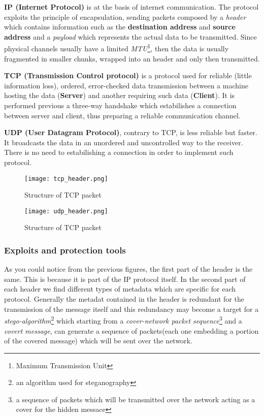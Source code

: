 \documentclass[../../main.tex]{subfiles}
\begin{document}
    \textbf{IP (Internet Protocol)} is at the basis of internet communication.
    The protocol exploits the principle of encapsulation, sending packets
    composed by a \emph{header} which contains information such as the
    \textbf{destination address} and \textbf{source address} and a
    \emph{payload} which represents the actual data to be transmitted.
    Since physical channels usually have a limited \emph{MTU}\footnote{Maximum
    Transmission Unit}, then the data is usually fragmented in smaller chunks,
    wrapped into an header and only then transmitted.
    
    \textbf{TCP (Transmission Control protocol)} is a protocol used for reliable
    (little information loss), ordered, error-checked data transmission between
    a machine hosting the data (\textbf{Server}) and another requiring such data
    (\textbf{Client}). It is performed previous a three-way handshake which
    estabilishes a connection between server and client, thus preparing a
    reliable communication channel.

    \textbf{UDP (User Datagram Protocol)}, contrary to TCP, is less reliable but
    faster.
    It broadcasts the data in an unordered and uncontrolled way to the receiver. 
    There is no need to estabilishing a connection in order to implement such
    protocol.

    \begin{figure}[h]
        \centering
        \caption{Structure of TCP packet}
        \texttt{[image: tcp\_header.png]}
    \end{figure}

    \begin{figure}[h]
        \centering
        \caption{Structure of TCP packet}
        \texttt{[image: udp\_header.png]}
    \end{figure}

    \pagebreak

    \subsubsection{Exploits and protection tools}

    As you could notice from the previous figures, the first part of the header
    is the same. This is because it is part of the IP protocol itself.
    In the second part of each header we find different types of metadata which
    are specific for each protocol. Generally the metadat contained in the
    header is redundant for the transmission of the message itself and this 
    redundancy may become a target for a \emph{stego-algorithm}\footnote{an
    algorithm used for steganography} which starting from a \emph{cover-network
    packet sequence}\footnote{a sequence of packets which will be transmitted
    over the network acting as a cover for the hidden messace} and a
    \emph{covert message}, can generate a sequence of packets(each one embedding
    a portion of the covered message) which will be sent over the network.
\end{document}

